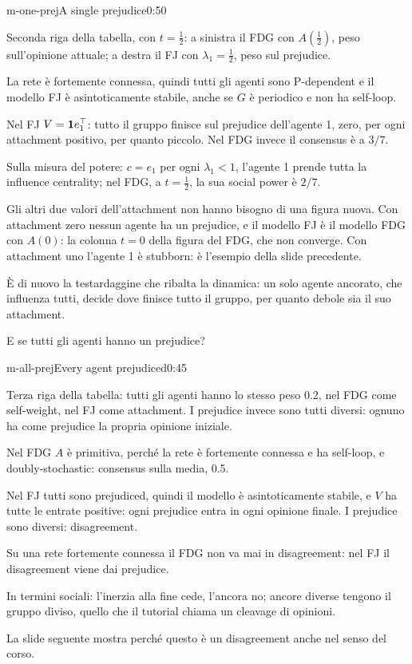 \begin{slide}{m-one-prej}{A single prejudice}{0:50}
  \begin{discorso}
    \item Seconda riga della tabella, con $t=\tfrac12$: a sinistra il FDG con $A(\tfrac12)$, peso sull'opinione attuale; a destra il FJ con $\lambda_1=\tfrac12$, peso sul prejudice.
    \item La rete è fortemente connessa, quindi tutti gli agenti sono P-dependent e il modello FJ è asintoticamente stabile, anche se $G$ è periodico e non ha self-loop.
    \item Nel FJ $V=\mathbf{1} e_1^\top$: tutto il gruppo finisce sul prejudice dell'agente 1, zero, per ogni attachment positivo, per quanto piccolo. Nel FDG invece il consensus è a $3/7$.
    \item Sulla misura del potere: $c=e_1$ per ogni $\lambda_1<1$, l'agente 1 prende tutta la influence centrality; nel FDG, a $t=\tfrac12$, la sua social power è $2/7$.
    \item Gli altri due valori dell'attachment non hanno bisogno di una figura nuova. Con attachment zero nessun agente ha un prejudice, e il modello FJ è il modello FDG con $A(0)$: la colonna $t=0$ della figura del FDG, che non converge. Con attachment uno l'agente 1 è stubborn: è l'esempio della slide precedente.
    \item È di nuovo la testardaggine che ribalta la dinamica: un solo agente ancorato, che influenza tutti, decide dove finisce tutto il gruppo, per quanto debole sia il suo attachment.
    \item E se tutti gli agenti hanno un prejudice?
  \end{discorso}
\end{slide}

\begin{slide}{m-all-prej}{Every agent prejudiced}{0:45}
  \begin{discorso}
    \item Terza riga della tabella: tutti gli agenti hanno lo stesso peso 0.2, nel FDG come self-weight, nel FJ come attachment. I prejudice invece sono tutti diversi: ognuno ha come prejudice la propria opinione iniziale.
    \item Nel FDG $A$ è primitiva, perché la rete è fortemente connessa e ha self-loop, e doubly-stochastic: consensus sulla media, 0.5.
    \item Nel FJ tutti sono prejudiced, quindi il modello è asintoticamente stabile, e $V$ ha tutte le entrate positive: ogni prejudice entra in ogni opinione finale. I prejudice sono diversi: disagreement.
    \item Su una rete fortemente connessa il FDG non va mai in disagreement: nel FJ il disagreement viene dai prejudice.
    \item In termini sociali: l'inerzia alla fine cede, l'ancora no; ancore diverse tengono il gruppo diviso, quello che il tutorial chiama un cleavage di opinioni.
    \item La slide seguente mostra perché questo è un disagreement anche nel senso del corso.
  \end{discorso}
\end{slide}

